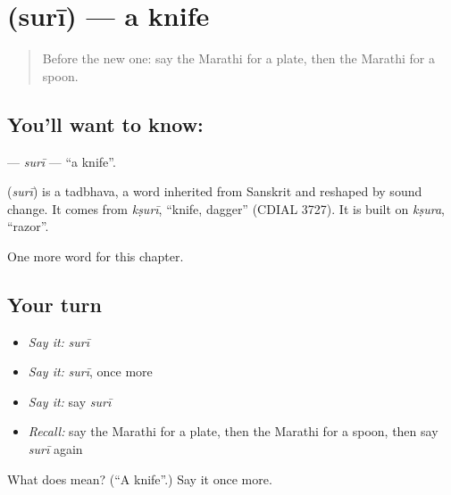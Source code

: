 \section[\texorpdfstring{\mr{सुरी} (surī)}{सुरी (surī)}]{ (surī) — a knife}

\label{lesson:MR-C92-suri}



\begin{quote}
Before the new one: say the Marathi for a plate, then the Marathi for a spoon.
\end{quote}

\subsection*{You'll want to know: }
\textbf{} — \emph{surī} — \textquotedblleft{}a knife\textquotedblright{}.

\begin{cousinweb}
\textbf{} (\emph{surī}) is a tadbhava, a word inherited from Sanskrit and reshaped by sound change. It comes from \emph{kṣurī}, \textquotedblleft{}knife, dagger\textquotedblright{} (CDIAL 3727). It is built on \emph{kṣura}, \textquotedblleft{}razor\textquotedblright{}.
\end{cousinweb}

\begin{grammarlens}[title={What you've built}]
One more word for this chapter.
\end{grammarlens}

\subsection*{Your turn}
\begin{itemize}
\raggedright
  \item \emph{Say it:} \emph{surī}
  \item \emph{Say it:} \emph{surī}, once more
  \item \emph{Say it:} say \emph{surī}
  \item \emph{Recall:} say the Marathi for a plate, then the Marathi for a spoon, then say \emph{surī} again
\end{itemize}

\begin{tcolorbox}[breakable,colback=teal!4,colframe=teal!35!black,title={Before you move on}]
What does  mean? (\textquotedblleft{}A knife\textquotedblright{}.) Say it once more.
\end{tcolorbox}
